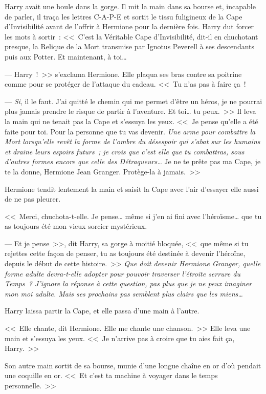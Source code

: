 Harry avait une boule dans la gorge. Il mit la main dans sa bourse et, incapable de parler, il traça les lettres C-A-P-E et sortit le tissu fuligineux de la Cape d'Invisibilité avant de l'offrir à Hermione pour la dernière fois. Harry dut forcer les mots à sortir~: <<~C'est la Véritable Cape d'Invisibilité, dit-il en chuchotant presque, la Relique de la Mort transmise par Ignotus Peverell à ses descendants puis aux Potter. Et maintenant, à toi…

--- Harry~!~>> s'exclama Hermione. Elle plaqua ses bras contre sa poitrine comme pour se protéger de l'attaque du cadeau. <<~Tu n'as pas à faire ça~!

--- \emph{Si}, il le faut. J'ai quitté le chemin qui me permet d'être un héros, je ne pourrai plus jamais prendre le risque de partir à l'aventure. Et toi… tu peux.~>> Il leva la main qui ne tenait pas la Cape et s'essuya les yeux. <<~Je pense qu'elle a été faite pour toi. Pour la personne que tu vas devenir. \emph{Une arme pour combattre la Mort lorsqu'elle revêt la forme de l'ombre du désespoir qui s'abat sur les humains et draine leurs espoirs futurs~; je crois que c'est elle que tu combattras, sous d'autres formes encore que celle des Détraqueurs…} Je ne te prête pas ma Cape, je te la donne, Hermione Jean Granger. Protège-la à jamais.~>>

Hermione tendit lentement la main et saisit la Cape avec l'air d'essayer elle aussi de ne pas pleurer.

<<~Merci, chuchota-t-elle. Je pense… même si j'en ai fini avec l'héroïsme… que tu as toujours été mon vieux sorcier mystérieux.

--- Et je pense~>>, dit Harry, sa gorge à moitié bloquée, <<~que même si tu rejettes cette façon de penser, tu as toujours été destinée à devenir l'héroïne, depuis le début de cette histoire.~>> \emph{Que doit devenir Hermione Granger, quelle forme adulte devra-t-elle adopter pour pouvoir traverser l'étroite serrure du Temps~? J'ignore la réponse à cette question, pas plus que je ne peux imaginer mon moi adulte. Mais ses prochains pas semblent plus clairs que les miens…}

Harry laissa partir la Cape, et elle passa d'une main à l'autre.

<<~Elle chante, dit Hermione. Elle me chante une chanson.~>> Elle leva une main et s'essuya les yeux. <<~Je n'arrive pas à croire que tu aies fait ça, Harry.~>>

Son autre main sortit de sa bourse, munie d'une longue chaîne en or d'où pendait une coquille en or. <<~Et c'est ta machine à voyager dans le temps personnelle.~>>

